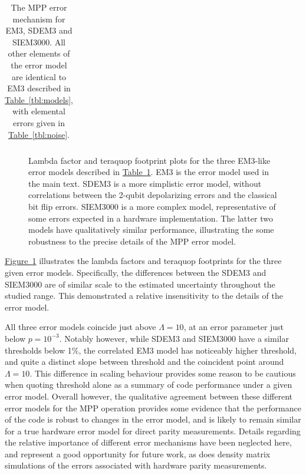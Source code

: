 \documentclass[onecolumn,a4paper,accepted=2022-09-12]{quantumarticle}
\theoremstyle{definition}
\theoremstyle{definition}
\theoremstyle{definition}
\newcommand{\fig}[1]{\hyperref[fig:#1]{Figure~\ref*{fig:#1}}}
\newcommand{\tbl}[1]{\hyperref[tbl:#1]{Table~\ref*{tbl:#1}}}
\begin{document}
\begin{table}[h]
{\begin{tabular}{|r|l|}
    \end{tabular}
    }
    \caption{
        The MPP error mechanism for EM3, SDEM3 and SIEM3000.
        All other elements of the error model are identical to EM3 described in \tbl{models}, with elemental errors given in \tbl{noise}.
    }
    \label{tbl:em3_mpp_noises}
\end{table}

\begin{figure}
    \centering
    \caption{
        Lambda factor and teraquop footprint plots for the three EM3-like error models described in \tbl{em3_mpp_noises}. EM3 is the error model used in the main text. SDEM3 is a more simplistic error model, without correlations between the 2-qubit depolarizing errors and the classical bit flip errors. SIEM3000 is a more complex model, representative of some errors expected in a hardware implementation. The latter two models have qualitatively similar performance, illustrating the some robustness to the precise details of the MPP error model.
    }
    \label{fig:em_comparison}
\end{figure}

\fig{em_comparison} illustrates the lambda factors and teraquop footprints for the three given error models. Specifically, the differences between the SDEM3 and SIEM3000 are of similar scale to the estimated uncertainty throughout the studied range. This demonstrated a relative insensitivity to the details of the error model.

All three error models coincide just above $\Lambda=10$, at an error parameter just below $p=10^{-3}$. Notably however, while SDEM3 and SIEM3000 have a similar thresholds below 1\%, the correlated EM3 model has noticeably higher threshold, and quite a distinct slope between threshold and the coincident point around $\Lambda=10$. This difference in scaling behaviour provides some reason to be cautious when quoting threshold alone as a summary of code performance under a given error model. Overall however, the qualitative agreement between these different error models for the MPP operation provides some evidence that the performance of the code is robust to changes in the error model, and is likely to remain similar for a true hardware error model for direct parity measurements. Details regarding the relative importance of different error mechanisms have been neglected here, and represent a good opportunity for future work, as does density matrix simulations of the errors associated with hardware parity measurements. 
\end{document}
